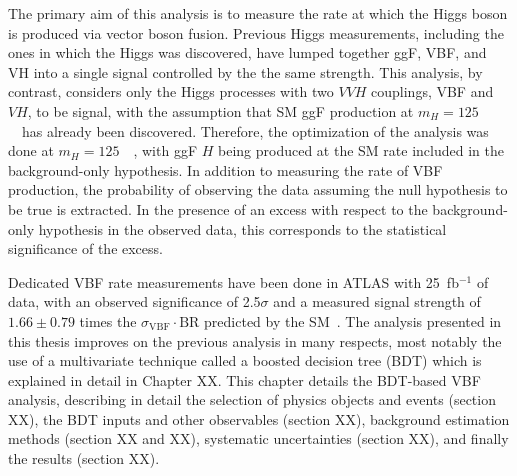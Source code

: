 
The primary aim of this analysis is to measure the rate at which the
Higgs boson is produced via vector boson fusion. Previous Higgs
measurements, including the ones in which the Higgs was discovered,
have lumped together ggF, VBF, and VH into a single signal controlled
by the the same strength. This analysis, by contrast, considers only the
Higgs processes with two $VVH$ couplings, VBF and $VH$, to be
signal, with the assumption that SM ggF production at
$m_H=125$~\gev~has already been discovered. Therefore, the
optimization of the analysis was done at $m_H=125$~\gev~, with ggF $H$
being produced at the SM rate included in the background-only hypothesis. In
addition to measuring the rate of VBF production, the probability of
observing the data assuming the null hypothesis to be true is
extracted. In the presence of an excess with respect to the
background-only hypothesis in the observed data, this
corresponds to the statistical significance of the excess.

Dedicated VBF rate measurements have been done in ATLAS with
25~fb$^{-1}$ of data, with an observed significance of 2.5$\sigma$ and
a measured signal strength of $1.66\pm 0.79$ times the
$\sigma_{\mathrm{VBF}}\cdot{\mathrm{BR}}$ predicted by the
SM~\cite{bib:hww_moriond_2013}. The analysis presented in this thesis
improves on the previous analysis in
many respects, most notably the use of a multivariate technique called
a boosted decision tree (BDT) which is explained in detail in Chapter
XX. This chapter details the BDT-based VBF analysis, describing in
detail the selection of physics objects and events (section XX), the
BDT inputs and other observables (section XX), background estimation
methods (section XX and XX), systematic uncertainties (section XX),
and finally the results (section XX). 
